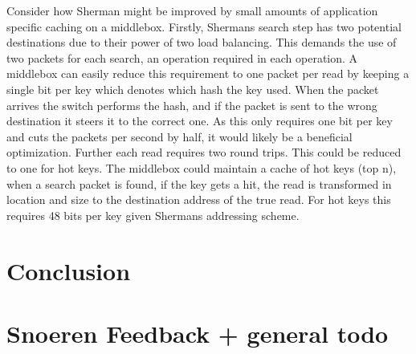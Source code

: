 Consider how Sherman might be improved by small amounts of application specific
caching on a middlebox. Firstly, Shermans search step has two potential
destinations due to their power of two load balancing. This demands the use of
two packets for each search, an operation required in each operation. A
middlebox can easily reduce this requirement to one packet per read by keeping a
single bit per key which denotes which hash the key used. When the packet
arrives the switch performs the hash, and if the packet is sent to the wrong
destination it steers it to the correct one. As this only requires one bit per
key and cuts the packets per second by half, it would likely be a beneficial
optimization. Further each read requires two round trips. This could be reduced
to one for hot keys. The middlebox could maintain a cache of hot keys (top n),
when a search packet is found, if the key gets a hit, the read is transformed in
location and size to the destination address of the true read. For hot keys this
requires 48 bits per key given Shermans addressing scheme.


\section{Conclusion}

\section{Snoeren Feedback + general todo}

